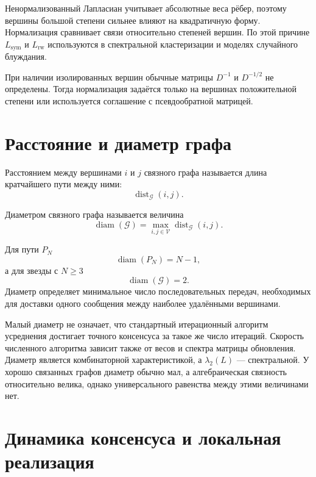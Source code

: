 Ненормализованный Лапласиан учитывает абсолютные веса рёбер, поэтому
вершины большой степени сильнее влияют на квадратичную форму.
Нормализация сравнивает связи относительно степеней вершин. По этой
причине \(L_{\mathrm{sym}}\) и \(L_{\mathrm{rw}}\) используются в
спектральной кластеризации и моделях случайного блуждания.

При наличии изолированных вершин обычные матрицы \(D^{-1}\) и
\(D^{-1/2}\) не определены. Тогда нормализация задаётся только на
вершинах положительной степени или используется соглашение с
псевдообратной матрицей.

\section{Расстояние и диаметр графа}

\begin{definition}
Расстоянием между вершинами \(i\) и \(j\) связного графа называется
длина кратчайшего пути между ними:
\[
    \operatorname{dist}_{\mathcal G}(i,j).
\]
\end{definition}

\begin{definition}[Диаметр]
Диаметром связного графа называется величина
\[
    \operatorname{diam}(\mathcal G)
    =
    \max_{i,j\in\mathcal V}
    \operatorname{dist}_{\mathcal G}(i,j).
\]
\end{definition}

Для пути \(P_N\)
\[
    \operatorname{diam}(P_N)=N-1,
\]
а для звезды с \(N\ge3\)
\[
    \operatorname{diam}(\mathcal G)=2.
\]
Диаметр определяет минимальное число последовательных передач,
необходимых для доставки одного сообщения между наиболее удалёнными
вершинами.

Малый диаметр не означает, что стандартный итерационный алгоритм
усреднения достигает точного консенсуса за такое же число итераций.
Скорость численного алгоритма зависит также от весов и спектра
матрицы обновления. Диаметр является комбинаторной характеристикой, а
\(\lambda_2(L)\) --- спектральной. У хорошо связанных графов диаметр
обычно мал, а алгебраическая связность относительно велика, однако
универсального равенства между этими величинами нет.

\section{Динамика консенсуса и локальная реализация}

